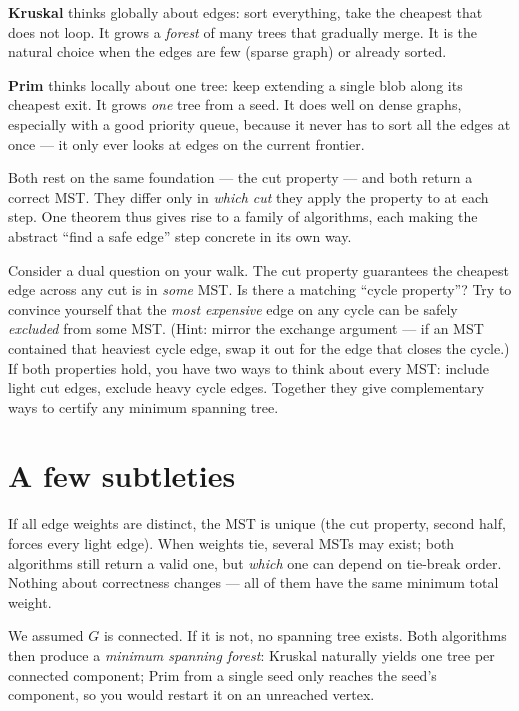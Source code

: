 \begin{intuitionbox}
\textbf{Kruskal} thinks globally about edges: sort everything, take the cheapest
that does not loop. It grows a \emph{forest} of many trees that gradually merge.
It is the natural choice when the edges are few (sparse graph) or already sorted.

\textbf{Prim} thinks locally about one tree: keep extending a single blob along
its cheapest exit. It grows \emph{one} tree from a seed. It does well on dense
graphs, especially with a good priority queue, because it never has to sort all
the edges at once --- it only ever looks at edges on the current frontier.
\end{intuitionbox}

Both rest on the same foundation --- the cut property --- and both return a
correct MST. They differ only in \emph{which cut} they apply the property to at
each step. One theorem thus gives rise to a family of algorithms, each making the
abstract ``find a safe edge'' step concrete in its own way.

\begin{walkbox}
Consider a dual question on your walk. The cut property guarantees the
cheapest edge across any cut is in \emph{some} MST. Is there a matching ``cycle
property''? Try to convince yourself that the \emph{most expensive} edge on any
cycle can be safely \emph{excluded} from some MST. (Hint: mirror the exchange
argument --- if an MST contained that heaviest cycle edge, swap it out for the
edge that closes the cycle.) If both properties hold, you have two ways to think
about every MST: include light cut edges, exclude heavy cycle edges. Together
they give complementary ways to certify any minimum spanning tree.
\end{walkbox}

\section{A few subtleties}

\begin{remark}
If all edge weights are distinct, the MST is unique (the cut property, second
half, forces every light edge). When weights tie, several MSTs may exist; both
algorithms still return a valid one, but \emph{which} one can depend on tie-break
order. Nothing about correctness changes --- all of them have the same minimum
total weight.
\end{remark}

\begin{remark}
We assumed $G$ is connected. If it is not, no spanning tree exists. Both
algorithms then produce a \emph{minimum spanning forest}: Kruskal naturally
yields one tree per connected component; Prim from a single seed only reaches the
seed's component, so you would restart it on an unreached vertex.
\end{remark}

